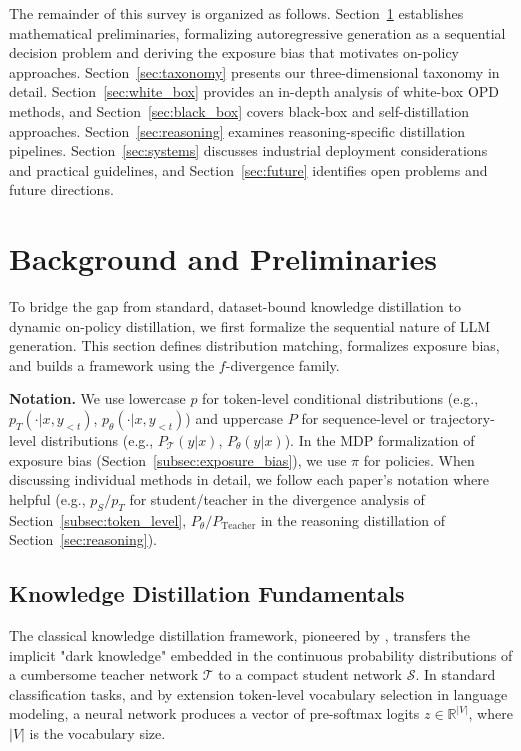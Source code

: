 \documentclass{article} %
\newcommand{\ptheta}{p_\theta}
\newcommand{\pteacher}{p_T}
\begin{document}
The remainder of this survey is organized as follows. Section~\ref{sec:background} establishes mathematical preliminaries, formalizing autoregressive generation as a sequential decision problem and deriving the exposure bias that motivates on-policy approaches. Section~\ref{sec:taxonomy} presents our three-dimensional taxonomy in detail. Section~\ref{sec:white_box} provides an in-depth analysis of white-box OPD methods, and Section~\ref{sec:black_box} covers black-box and self-distillation approaches. Section~\ref{sec:reasoning} examines reasoning-specific distillation pipelines. Section~\ref{sec:systems} discusses industrial deployment considerations and practical guidelines, and Section~\ref{sec:future} identifies open problems and future directions.


\section{Background and Preliminaries}
\label{sec:background}

To bridge the gap from standard, dataset-bound knowledge distillation to dynamic on-policy distillation, we first formalize the sequential nature of LLM generation. This section defines distribution matching, formalizes exposure bias, and builds a framework using the $f$-divergence family.

\textbf{Notation.} We use lowercase $p$ for token-level conditional distributions (e.g., $\pteacher(\cdot|x, y_{<t})$, $\ptheta(\cdot|x, y_{<t})$) and uppercase $P$ for sequence-level or trajectory-level distributions (e.g., $P_{\mathcal{T}}(y|x)$, $P_\theta(y|x)$). In the MDP formalization of exposure bias (Section~\ref{subsec:exposure_bias}), we use $\pi$ for policies. When discussing individual methods in detail, we follow each paper's notation where helpful (e.g., $p_S/p_T$ for student/teacher in the divergence analysis of Section~\ref{subsec:token_level}, $P_\theta/P_{\text{Teacher}}$ in the reasoning distillation of Section~\ref{sec:reasoning}).

\subsection{Knowledge Distillation Fundamentals}
\label{subsec:kd_fundamentals}

The classical knowledge distillation framework, pioneered by \citet{hinton2015distilling}, transfers the implicit "dark knowledge" embedded in the continuous probability distributions of a cumbersome teacher network $\mathcal{T}$ to a compact student network $\mathcal{S}$. In standard classification tasks, and by extension token-level vocabulary selection in language modeling, a neural network produces a vector of pre-softmax logits $z \in \mathbb{R}^{|V|}$, where $|V|$ is the vocabulary size.
\end{document}
